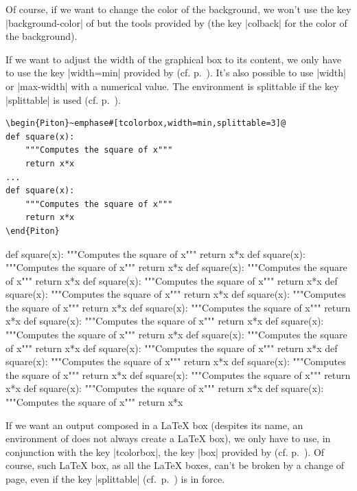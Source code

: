 \documentclass{article}
\begin{document}
Of course, if we want to change the color of the background, we won't use the key
|background-color| of  but the tools provided by 
(the key |colback| for the color of the background).

\bigskip
If we want to adjust the width of the graphical box to its content, we only
have to use the key |width=min| provided by  (cf.
p.~\pageref{width}). It's also possible to use |width| or |max-width| with a
numerical value. The environment is splittable if the key |splittable| is used (cf.
p.~\pageref{page breaks}).

\begin{Verbatim}
\begin{Piton}~emphase#[tcolorbox,width=min,splittable=3]@
def square(x):
    """Computes the square of x"""
    return x*x
...
def square(x):
    """Computes the square of x"""
    return x*x
\end{Piton}
\end{Verbatim}

\begin{Piton}[tcolorbox,width=min,splittable=3]
def square(x):
    """Computes the square of x"""
    return x*x
def square(x):
    """Computes the square of x"""
    return x*x
def square(x):
    """Computes the square of x"""
    return x*x
def square(x):
    """Computes the square of x"""
    return x*x
def square(x):
    """Computes the square of x"""
    return x*x
def square(x):
    """Computes the square of x"""
    return x*x
def square(x):
    """Computes the square of x"""
    return x*x
def square(x):
    """Computes the square of x"""
    return x*x
def square(x):
    """Computes the square of x"""
    return x*x
def square(x):
    """Computes the square of x"""
    return x*x
def square(x):
    """Computes the square of x"""
    return x*x
def square(x):
    """Computes the square of x"""
    return x*x
def square(x):
    """Computes the square of x"""
    return x*x
def square(x):
    """Computes the square of x"""
    return x*x
def square(x):
    """Computes the square of x"""
    return x*x
def square(x):
    """Computes the square of x"""
    return x*x
\end{Piton}

\bigskip
If we want an output composed in a LaTeX box (despites its name, an environment
of  does not always create a LaTeX box), we only have to use,
in conjunction with the key |tcolorbox|, the key |box| provided by 
(cf. p.~\pageref{box}). Of course, such LaTeX box, as all the LaTeX boxes, can't
be broken by a change of page, even if the key |splittable| (cf.~p.~\pageref{splittable})
is in force.
\end{document}
